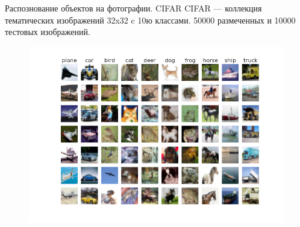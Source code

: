 \documentclass{beamer}
\begin{document}
\begin{frame}{Распознование объектов на фотографии. CIFAR}
    CIFAR --- коллекция тематических изображений 32x32 c 10ю классами. 50000 размеченных и 10000 тестовых изображений.
    \begin{figure}
        \includegraphics[width=0.9\linewidth]{fig/cifar.png}
    \end{figure}
\end{frame}
\end{document}
